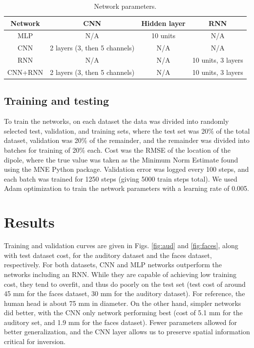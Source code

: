 \documentclass[journal]{IEEEtran}
\begin{document}
\begin{table}[h!]
  \centering
  \begin{tabular}{c||c|c|c}
    \hline
    Network & CNN & Hidden layer & RNN\\
    \hline
    \hline
    MLP & N/A & 10 units & N/A \\
    \hline
    CNN & 2 layers (3, then 5 channels) & N/A & N/A \\
    \hline
    RNN & N/A & N/A & 10 units, 3 layers \\
    \hline
    CNN+RNN & 2 layers (3, then 5 channels) &  N/A & 10 units, 3 layers \\
  \end{tabular}
  \caption{Network parameters.}
  \label{tab:params}
\end{table}


\subsection{Training and testing}

To train the networks, on each dataset the data was divided into randomly selected test, validation, and training sets, where the test set was 20\% of the total dataset, validation was 20\% of the remainder, and the remainder was divided into batches for training of 20\% each. Cost was the RMSE of the location of the dipole, where the true value was taken as the Minimum Norm Estimate found using the MNE Python package. Validation error was logged every 100 steps, and each batch was trained for 1250 steps (giving 5000 train steps total). We used Adam optimization to train the network parameters \cite{kingma2014adam} with a learning rate of 0.005.

\section{Results}

Training and validation curves are given in Figs. \ref{fig:aud} and \ref{fig:faces}, along with test dataset cost, for the auditory dataset and the faces dataset, respectively. For both datasets, CNN and MLP networks outperform the networks including an RNN. While they are capable of achieving low training cost, they tend to overfit, and thus do poorly on the test set (test cost of around 45 mm for the faces dataset, 30 mm for the auditory dataset). For reference, the human head is about 75 mm in diameter. On the other hand, simpler networks did better, with the CNN only network performing best (cost of 5.1 mm for the auditory set, and 1.9 mm for the faces dataset). Fewer parameters allowed for better generalization, and the CNN layer allows us to preserve spatial information critical for inversion.
\end{document}
